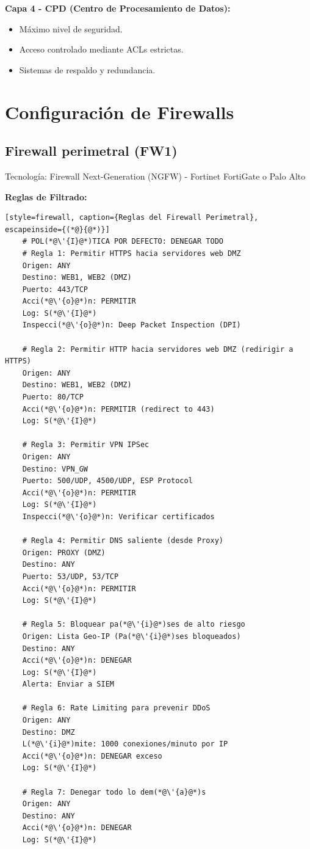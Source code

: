 \documentclass[12pt,letterpaper]{article}
\begin{document}
\noindent\textbf{Capa 4 - CPD (Centro de Procesamiento de Datos):}
\begin{itemize}
    \item Máximo nivel de seguridad.
    \item Acceso controlado mediante ACLs estrictas.
    \item Sistemas de respaldo y redundancia.
\end{itemize}

\section{\textcolor{azuloscuro}{Configuración de Firewalls}}
\subsection{\textcolor{azuloscuro}{Firewall perimetral (FW1)}}

\noindent Tecnología: Firewall Next-Generation (NGFW) - Fortinet FortiGate o Palo Alto

\noindent\textbf{Reglas de Filtrado:}
\begin{lstlisting}[style=firewall, caption={Reglas del Firewall Perimetral}, escapeinside={(*@}{@*)}]
    # POL(*@\'{I}@*)TICA POR DEFECTO: DENEGAR TODO
    # Regla 1: Permitir HTTPS hacia servidores web DMZ
    Origen: ANY
    Destino: WEB1, WEB2 (DMZ)
    Puerto: 443/TCP
    Acci(*@\'{o}@*)n: PERMITIR
    Log: S(*@\'{I}@*)
    Inspecci(*@\'{o}@*)n: Deep Packet Inspection (DPI)
    
    # Regla 2: Permitir HTTP hacia servidores web DMZ (redirigir a HTTPS)
    Origen: ANY
    Destino: WEB1, WEB2 (DMZ)
    Puerto: 80/TCP
    Acci(*@\'{o}@*)n: PERMITIR (redirect to 443)
    Log: S(*@\'{I}@*)
    
    # Regla 3: Permitir VPN IPSec
    Origen: ANY
    Destino: VPN_GW
    Puerto: 500/UDP, 4500/UDP, ESP Protocol
    Acci(*@\'{o}@*)n: PERMITIR
    Log: S(*@\'{I}@*)
    Inspecci(*@\'{o}@*)n: Verificar certificados
    
    # Regla 4: Permitir DNS saliente (desde Proxy)
    Origen: PROXY (DMZ)
    Destino: ANY
    Puerto: 53/UDP, 53/TCP
    Acci(*@\'{o}@*)n: PERMITIR
    Log: S(*@\'{I}@*)
    
    # Regla 5: Bloquear pa(*@\'{i}@*)ses de alto riesgo
    Origen: Lista Geo-IP (Pa(*@\'{i}@*)ses bloqueados)
    Destino: ANY
    Acci(*@\'{o}@*)n: DENEGAR
    Log: S(*@\'{I}@*)
    Alerta: Enviar a SIEM
    
    # Regla 6: Rate Limiting para prevenir DDoS
    Origen: ANY
    Destino: DMZ
    L(*@\'{i}@*)mite: 1000 conexiones/minuto por IP
    Acci(*@\'{o}@*)n: DENEGAR exceso
    Log: S(*@\'{I}@*)
    
    # Regla 7: Denegar todo lo dem(*@\'{a}@*)s
    Origen: ANY
    Destino: ANY
    Acci(*@\'{o}@*)n: DENEGAR
    Log: S(*@\'{I}@*)
\end{lstlisting}
\end{document}
